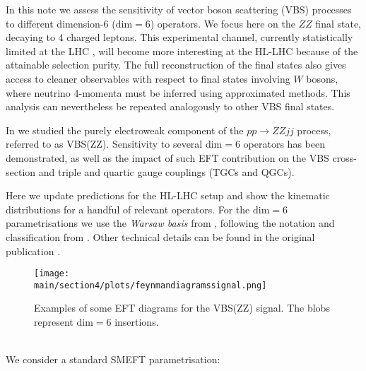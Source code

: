 
In this note we assess the sensitivity of vector boson scattering (VBS) processes to different dimension-6 ($\mathrm{dim=6}$) operators. We focus here on the $ZZ$ final state, decaying to 4 charged leptons. This experimental channel, currently statistically limited at the LHC \cite{Sirunyan:2017fvv}, will become more interesting at the HL-LHC because of the attainable selection purity. The full reconstruction of the final states also gives access to cleaner observables with respect to final states involving $W$ bosons, where neutrino 4-momenta must be inferred using approximated methods.
This analysis can nevertheless be repeated analogously to other VBS final states. 

In \cite{Gomez-Ambrosio:2018pnl} we studied the purely electroweak component of the $p p \to Z Z j j$ process, referred to as VBS(ZZ). Sensitivity to several $\mathrm{dim=6}$ operators has been demonstrated, as well as the impact of such EFT contribution on the VBS cross-section and triple and quartic gauge couplings (TGCs and QGCs). 

Here we update predictions for the HL-LHC setup and show the kinematic distributions for a handful of relevant operators. For the $\mathrm{dim=6}$ parametrisations we use the \emph{Warsaw basis} from \cite{Grzadkowski:2010es}, following the notation and classification from \cite{Jenkins:2013zja}. Other technical details can be found in the original publication \cite{Gomez-Ambrosio:2018pnl}.

\begin{figure}[h!]
\texttt{[image: \\main/section4/plots/feynmandiagramssignal.png]}
\caption{Examples of some EFT diagrams for the VBS(ZZ) signal. The blobs represent $\mathrm{dim=6}$ insertions.}
\end{figure}

\\
%
We consider a standard SMEFT parametrisation:

